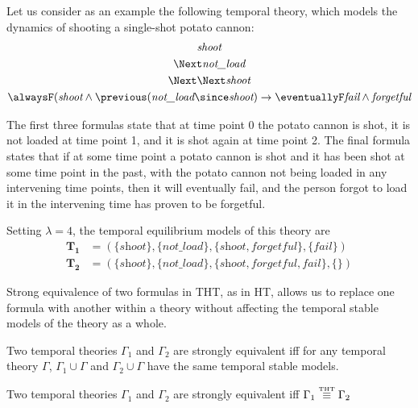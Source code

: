 \begin{example}\label{exam:shoot-ground-theory}
  Let us consider as an example the following temporal theory, which
  models the dynamics of shooting a single-shot potato cannon:
\begin{equation*}
\begin{gathered}
\textit{shoot}\\
\Next\textit{not\_load}\\
\Next\Next\textit{shoot}\\
\alwaysF(\textit{shoot} \wedge \previous(\textit{not\_load} \since \textit{shoot})
\rightarrow \eventuallyF \textit{fail} \wedge \textit{forgetful}
\end{gathered}
\end{equation*}

The first three formulas state that at time point 0 the potato cannon
is shot, it is not loaded at time point 1, and it is shot again at
time point 2. The final formula states that if at some time point a
potato cannon is shot and it has been shot at some time point in the
past, with the potato cannon not being loaded in any intervening time
points, then it will eventually fail, and the person forgot to load it
in the intervening time has proven to be forgetful.

Setting $\lambda=4$, the temporal equilibrium models of this theory
are
\begin{align*}
\bm{T_1}&=(\{\textit{shoot}\}, \{\textit{not\_load}\},
\{\textit{shoot}, \textit{forgetful}\}, \{ \textit{fail} \})\\
\bm{T_2}&=(\{\textit{shoot}\}, \{\textit{not\_load}\},
\{\textit{shoot}, \textit{forgetful}, \textit{fail}\}, \{ \})
\end{align*}
\end{example}

Strong equivalence of two formulas in THT, as in HT, allows us to
replace one formula with another within a theory without affecting the
temporal stable models of the theory as a whole.

\begin{definition}
  Two temporal theories $\Gamma_1$ and $\Gamma_2$ are strongly
  equivalent iff for any temporal theory $\Gamma$,
  $\Gamma_1 \cup \Gamma$ and $\Gamma_2 \cup \Gamma$ have the same
  temporal stable models.
\end{definition}

\begin{proposition}
  Two temporal theories $\Gamma_1$ and $\Gamma_2$ are strongly equivalent
  iff $\Gamma_1 \stackrel{\normalfont\mbox{\tiny THT}}{\equiv} \Gamma_2$
\end{proposition}

